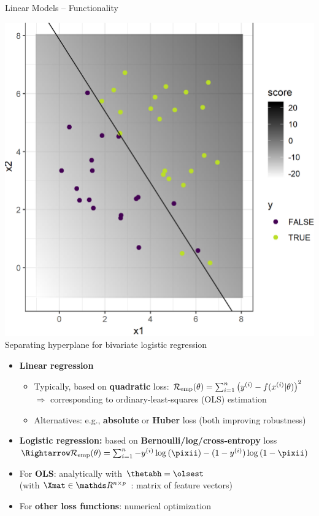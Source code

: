 \begin{vbframe}{Linear Models -- Functionality}
\begin{minipage}[b]{0.32\textwidth}
  \begin{center}
    \includegraphics[height=0.6\textwidth, keepaspectratio=true]{
    figure/logreg-2vars-data.png} \\
    \tiny{Separating hyperplane for bivariate logistic regression}
\end{center}
\end{minipage}

\framebreak


\begin{itemize}
  \item \textbf{Linear regression}
  \begin{itemize}
    \footnotesize
    \item Typically, based on \textbf{quadratic} loss: $\mathcal{R}_{\text{emp}}(\theta) = 
    \sum_{i=1}^n \left(y^{(i)} - f(x^{(i)} | \theta) \right)^2$ \\
    $\Rightarrow$ corresponding to ordinary-least-squares (OLS) estimation
    \item Alternatives: e.g., \textbf{absolute} or \textbf{Huber} loss (both 
    improving robustness)
  \end{itemize}
  \item \textbf{Logistic regression:} based on 
  \textbf{Bernoulli/log/cross-entropy} loss ~ 
  $\Rightarrow \risket = \sumin -\yi \log 
  \left(\pixii\right) - (1 - \yi) \log \left(1 - \pixii \right)$
\end{itemize}

\medskip

\begin{itemize}\footnotesize
  \item For \textbf{OLS}: analytically with 
  $\thetabh = \olsest$ \\
  (with $\Xmat \in \R^{n \times p}$ : matrix of feature vectors)
  \item For \textbf{other loss functions}: numerical optimization 
\end{itemize}


\end{vbframe}
